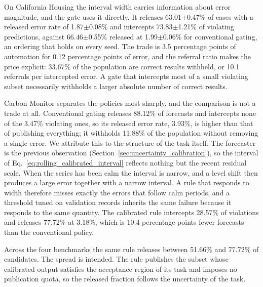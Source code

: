 \documentclass[preprint,12pt,authoryear]{elsarticle}
\begin{document}
On California Housing the interval width carries information about error magnitude, and the gate uses it directly.
It releases 63.01$\pm$0.47\% of cases with a released error rate of 1.87$\pm$0.08\% and intercepts 73.83$\pm$1.21\% of violating predictions, against 66.46$\pm$0.55\% released at 1.99$\pm$0.06\% for conventional gating, an ordering that holds on every seed.
The trade is 3.5 percentage points of automation for 0.12 percentage points of error, and the referral ratio makes the price explicit: 33.67\% of the population are correct results withheld, or 10.1 referrals per intercepted error.
A gate that intercepts most of a small violating subset necessarily withholds a larger absolute number of correct results.

Carbon Monitor separates the policies most sharply, and the comparison is not a trade at all.
Conventional gating releases 88.12\% of forecasts and intercepts none of the 3.47\% violating ones, so its released error rate, 3.93\%, is higher than that of publishing everything; it withholds 11.88\% of the population without removing a single error.
We attribute this to the structure of the task itself.
The forecaster is the previous observation (Section~\ref{sec:uncertainty_calibration}), so the interval of Eq.~\eqref{eq:rolling_calibrated_interval} reflects nothing but the recent residual scale.
When the series has been calm the interval is narrow, and a level shift then produces a large error together with a narrow interval.
A rule that responds to width therefore misses exactly the errors that follow calm periods, and a threshold tuned on validation records inherits the same failure because it responds to the same quantity.
The calibrated rule intercepts 28.57\% of violations and releases 77.72\% at 3.18\%, which is 10.4 percentage points fewer forecasts than the conventional policy.

Across the four benchmarks the same rule releases between 51.66\% and 77.72\% of candidates.
The spread is intended.
The rule publishes the subset whose calibrated output satisfies the acceptance region of its task and imposes no publication quota, so the released fraction follows the uncertainty of the task.
\end{document}
